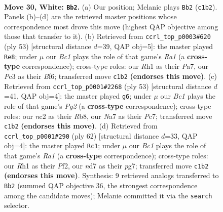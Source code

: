 \documentclass[11pt]{article}
\begin{document}
\clearpage

\begin{figure}[p]\centering
\begin{subfigure}{0.46\textwidth}\centering
\resizebox{\linewidth}{!}{%
\newchessgame
\chessboard[
  setfen={3k2r1/Nppnp2p/6p1/p7/5P1P/2P5/P1n2PK1/2B4R w - - 5 30},
  showmover=false,
  pgfstyle=straightmove, color=movearrow, markmove={c1-b2}
]}
\caption{}
\end{subfigure}\hfill
\begin{subfigure}{0.46\textwidth}\centering
\resizebox{\linewidth}{!}{%
\newchessgame
\chessboard[
  setfen={r5k1/pp6/4Nbp1/n3pp2/P1P5/2P5/1P4PP/2BR2K1 b - - 0 27},
  showmover=false,
  pgfstyle=straightmove, color=movearrow, markmove={a8-e8}
]}
\caption{}
\end{subfigure}
\\[4pt]
\begin{subfigure}{0.46\textwidth}\centering
\resizebox{\linewidth}{!}{%
\newchessgame
\chessboard[
  setfen={1r5k/2p3pp/2p5/p7/2b5/P5N1/2P2PPP/3R2K1 b - - 0 27},
  showmover=false,
  pgfstyle=straightmove, color=movearrow, markmove={g7-g6}
]}
\caption{}
\end{subfigure}\hfill
\begin{subfigure}{0.46\textwidth}\centering
\resizebox{\linewidth}{!}{%
\newchessgame
\chessboard[
  setfen={5r1k/2p2ppp/1n6/1p6/1p1PN3/1P5P/5PP1/R5K1 w - - 1 32},
  showmover=false,
  pgfstyle=straightmove, color=movearrow, markmove={a1-c1}
]}
\caption{}
\end{subfigure}
\caption{\textbf{Move 30, White: \texttt{Bb2}.} (a) Our position; Melanie plays \texttt{Bb2} (\texttt{c1b2}). Panels (b)--(d) are the retrieved master positions whose correspondence most drove this move (highest QAP objective among those that transfer to it). (b) Retrieved from \texttt{ccrl\_top\_p0003\#620} (ply 53) [structural distance $d$=39, QAP obj=5]: the master played \texttt{Re8}; under $\mu$ our \emph{Bc1} plays the role of that game's \emph{Ra1} (a \textbf{cross-type} correspondence); cross-type roles: our \emph{R}h1 as their \emph{P}a7, our \emph{P}c3 as their \emph{B}f6; transferred move \texttt{c1b2} \textbf{(endorses this move)}. (c) Retrieved from \texttt{ccrl\_top\_p0001\#2268} (ply 53) [structural distance $d$=41, QAP obj=4]: the master played \texttt{g6}; under $\mu$ our \emph{Bc1} plays the role of that game's \emph{Pg2} (a \textbf{cross-type} correspondence); cross-type roles: our \emph{n}c2 as their \emph{R}b8, our \emph{N}a7 as their \emph{P}c7; transferred move \texttt{c1b2} \textbf{(endorses this move)}. (d) Retrieved from \texttt{ccrl\_top\_p0001\#290} (ply 62) [structural distance $d$=33, QAP obj=4]: the master played \texttt{Rc1}; under $\mu$ our \emph{Bc1} plays the role of that game's \emph{Ra1} (a \textbf{cross-type} correspondence); cross-type roles: our \emph{R}h1 as their \emph{P}f2, our \emph{n}d7 as their \emph{p}g7; transferred move \texttt{c1b2} \textbf{(endorses this move)}. Synthesis: 9 retrieved analogs transferred to \texttt{Bb2} (summed QAP objective 36, the strongest correspondence among the candidate moves); Melanie committed it via the \texttt{search} selector.}
\label{fig:thought-m58}
\end{figure}
\end{document}
